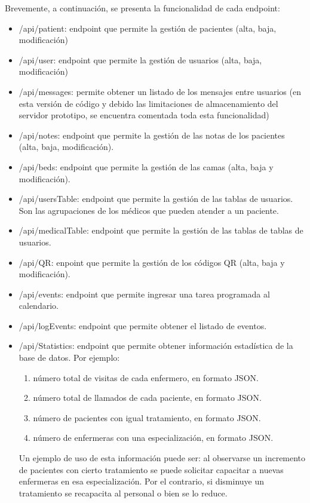 Brevemente, a continuación, se presenta la funcionalidad de cada endpoint:
\begin{itemize}
\item /api/patient: endpoint que permite la gestión de pacientes (alta, baja, modificación)
\item /api/user: endpoint que permite la gestión de usuarios (alta, baja, modificación)
\item /api/messages: permite obtener un listado de los mensajes entre usuarios (en esta versión de código y debido las limitaciones de almacenamiento del servidor prototipo, se encuentra comentada toda esta funcionalidad)
\item /api/notes: endpoint que permite la gestión de las notas de los pacientes (alta, baja, modificación). 
\item /api/beds: endpoint que permite la gestión de las camas (alta, baja y modificación). 
\item /api/usersTable: endpoint que permite la gestión de las tablas de usuarios. Son las agrupaciones de los médicos que pueden atender a un paciente. 
\item /api/medicalTable: endpoint que permite la gestión de las tablas de tablas de usuarios.
\item /api/QR: enpoint que permite la gestión de los códigos QR (alta, baja y modificación).
\item /api/events: endpoint que permite ingresar una tarea programada al calendario.
\item /api/logEvents: endpoint que permite obtener el listado de eventos.
\item /api/Statistics: endpoint que permite obtener información estadística de la base de datos. Por ejemplo:
\begin{enumerate}
\item número total de visitas de cada enfermero, en formato JSON.
\item número total de llamados de cada paciente, en formato JSON.
\item número de pacientes con igual tratamiento, en formato JSON.
\item número de enfermeras con una especialización, en formato JSON.
\end{enumerate}

Un ejemplo de uso de esta información puede ser: al observarse un incremento de pacientes con cierto tratamiento se puede solicitar capacitar a nuevas enfermeras en esa especialización. Por el contrario, si disminuye un tratamiento se recapacita al personal o bien se lo reduce.


\end{itemize}
